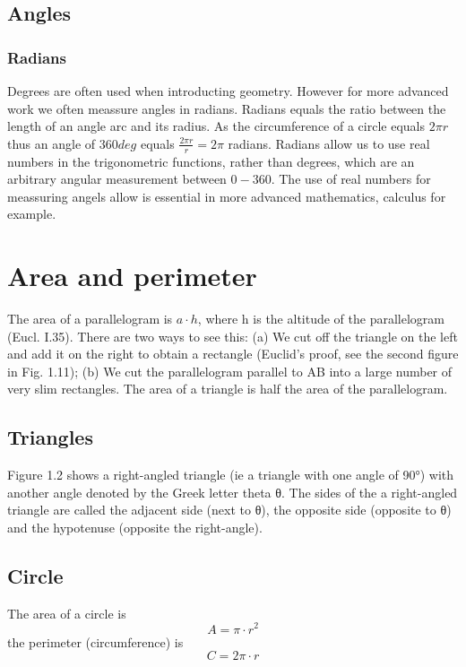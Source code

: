 \subsection{Angles}

\subsubsection{Radians}
Degrees are often used when introducting geometry. However for more advanced  work we often meassure angles in radians. Radians equals the ratio between the length of an angle arc and its radius. As the circumference of a circle equals $2\pi r$ thus an angle of $360 deg$ equals $\frac{2\pi r}{r} = 2\pi$ radians. Radians allow us to use real numbers in the trigonometric functions, rather than degrees, which are an arbitrary angular measurement between $0-360$. The use of real numbers for meassuring angels allow is essential in more advanced mathematics, calculus for example.

\section{Area and perimeter}
The area of a parallelogram is $a \cdot h$, where h is the altitude of the parallelogram (Eucl. I.35). There are two ways to see this: (a) We cut off the triangle on the left and add it on the right to obtain a rectangle (Euclid’s proof, see the second figure in Fig. 1.11); (b) We cut the parallelogram parallel to AB into a large number of very slim rectangles. The area of a triangle is half the area of the parallelogram.

\subsection{Triangles}
Figure 1.2 shows a right-angled triangle (ie a triangle with one angle of 90°) with another angle denoted by the Greek letter theta θ. The sides of the a right-angled triangle are called the adjacent side (next to θ), the opposite side (opposite to θ) and the hypotenuse (opposite the right-angle).

\subsection{Circle}
\begin{figure}[H]
\end{figure}
\noindent The area of a circle is
\begin{equation}
A = \pi \cdot r^2
\end{equation}
the perimeter (circumference) is
\begin{equation}
C = 2\pi \cdot r
\end{equation}

